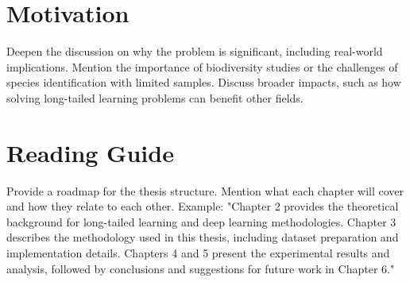\section{Motivation}
Deepen the discussion on why the problem is significant, including real-world implications.
Mention the importance of biodiversity studies or the challenges of species identification with limited samples.
Discuss broader impacts, such as how solving long-tailed learning problems can benefit other fields.

\section{Reading Guide}
Provide a roadmap for the thesis structure.
Mention what each chapter will cover and how they relate to each other.
Example: "Chapter 2 provides the theoretical background for long-tailed learning and deep learning methodologies. Chapter 3 describes the methodology used in this thesis, including dataset preparation and implementation details. Chapters 4 and 5 present the experimental results and analysis, followed by conclusions and suggestions for future work in Chapter 6."

